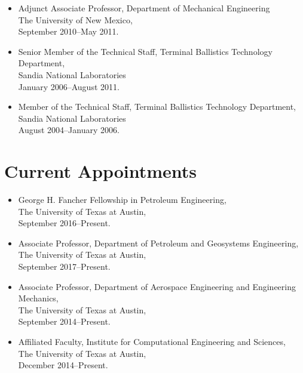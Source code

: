\begin{itemize}
    \item Adjunct Associate Professor, Department of Mechanical Engineering \\
          The University of New Mexico, \\ 
          September 2010--May 2011.

    \item Senior Member of the Technical Staff, Terminal Ballistics Technology Department, \\ 
          Sandia National Laboratories \\
          January 2006--August 2011.

    \item Member of the Technical Staff, Terminal Ballistics Technology Department, \\ 
          Sandia National Laboratories\\
          August 2004--January 2006.
\end{itemize}
\else
\section*{Current Appointments}

\begin{itemize}
    \item George H. Fancher Fellowship in Petroleum Engineering, \\ 
          The University of Texas at Austin, \\
          September 2016--Present. 

    \item Associate Professor, Department of Petroleum and Geosystems Engineering, \\ 
          The University of Texas at Austin, \\
          September 2017--Present. 

      \item Associate Professor, Department of Aerospace Engineering and Engineering Mechanics, \\ 
          The University of Texas at Austin, \\
          September 2014--Present. 

    \item Affiliated Faculty, Institute for Computational Engineering and Sciences, \\ 
          The University of Texas at Austin, \\
          December 2014--Present. 
\end{itemize}
\fi

